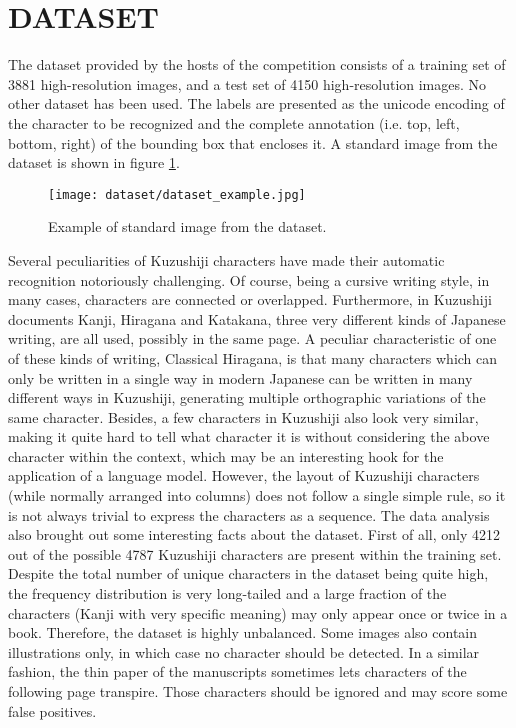 \section{DATASET}
\label{sec:dataset}

The dataset provided by the hosts of the competition consists of a training set of 3881 high-resolution images, and a test set of 4150 high-resolution images. No other dataset  has been used. The labels are presented as the unicode encoding of the character to be recognized and the complete annotation (i.e. top, left, bottom, right) of the bounding box that encloses it. A standard image from the dataset is shown in figure \ref{fig:dataset_example}. \\

\begin{figure}[h]
	\caption{Example of standard image from the dataset.}
	\centering
	\texttt{[image: dataset/dataset\_example.jpg]}
	\label{fig:dataset_example}
\end{figure}

Several peculiarities of Kuzushiji characters have made their automatic recognition notoriously challenging. Of course, being a cursive writing style, in many cases, characters are connected or overlapped. Furthermore, in Kuzushiji documents Kanji, Hiragana and Katakana, three very different kinds of Japanese writing, are all used, possibly in the same page. A peculiar characteristic of one of these kinds of writing, Classical Hiragana, is that many characters which can only be written in a single way in modern Japanese can be written in many different ways in Kuzushiji, generating multiple orthographic variations of the same character. Besides, a few characters in Kuzushiji also look very similar, making it quite hard to tell what character it is without considering the above character within the context, which may be an interesting hook for the application of a language model. However, the layout of Kuzushiji characters (while normally arranged into columns) does not follow a single simple rule, so it is not always trivial to express the characters as a sequence. The data analysis also brought out some interesting facts about the dataset. First of all, only 4212 out of the possible 4787 Kuzushiji characters are present within the training set. Despite the total number of unique characters in the dataset being quite high, the frequency distribution is very long-tailed and a large fraction of the characters (Kanji with very specific meaning) may only appear once or twice in a book. Therefore, the dataset is highly unbalanced. Some images also contain illustrations only, in which case no character should be detected. In a similar fashion, the thin paper of the manuscripts sometimes lets characters of the following page transpire. Those characters should be ignored and may score some false positives.
